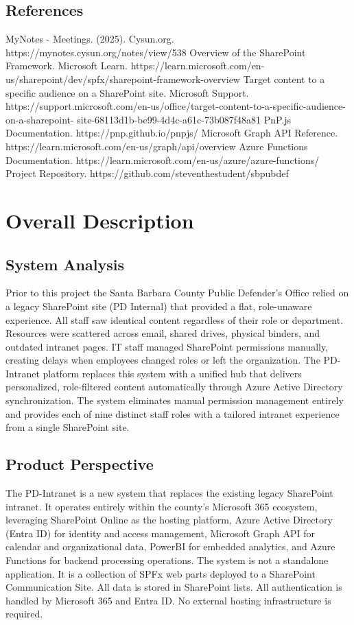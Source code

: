 \documentclass[12pt]{article}
\begin{document}
\subsection{References}

MyNotes - Meetings. (2025). Cysun.org. https://mynotes.cysun.org/notes/view/538 Overview of the SharePoint Framework. Microsoft Learn. https://learn.microsoft.com/en-us/sharepoint/dev/spfx/sharepoint-framework-overview Target content to a specific audience on a SharePoint site. Microsoft Support. https://support.microsoft.com/en-us/office/target-content-to-a-specific-audience-on-a-sharepoint- site-68113d1b-be99-4d4c-a61c-73b087f48a81 PnP.js Documentation. https://pnp.github.io/pnpjs/ Microsoft Graph API Reference. https://learn.microsoft.com/en-us/graph/api/overview Azure Functions Documentation. https://learn.microsoft.com/en-us/azure/azure-functions/ Project Repository. https://github.com/steventhestudent/sbpubdef

\section{Overall Description}

\subsection{System Analysis}

Prior to this project the Santa Barbara County Public Defender's Office relied on a legacy SharePoint site (PD Internal) that provided a flat, role-unaware experience. All staff saw identical content regardless of their role or department. Resources were scattered across email, shared drives, physical binders, and outdated intranet pages. IT staff managed SharePoint permissions manually, creating delays when employees changed roles or left the organization. The PD-Intranet platform replaces this system with a unified hub that delivers personalized, role-filtered content automatically through Azure Active Directory synchronization. The system eliminates manual permission management entirely and provides each of nine distinct staff roles with a tailored intranet experience from a single SharePoint site.

\subsection{Product Perspective}

The PD-Intranet is a new system that replaces the existing legacy SharePoint intranet. It operates entirely within the county's Microsoft 365 ecosystem, leveraging SharePoint Online as the hosting platform, Azure Active Directory (Entra ID) for identity and access management, Microsoft Graph API for calendar and organizational data, PowerBI for embedded analytics, and Azure Functions for backend processing operations. The system is not a standalone application. It is a collection of SPFx web parts deployed to a SharePoint Communication Site. All data is stored in SharePoint lists. All authentication is handled by Microsoft 365 and Entra ID. No external hosting infrastructure is required.
\end{document}
